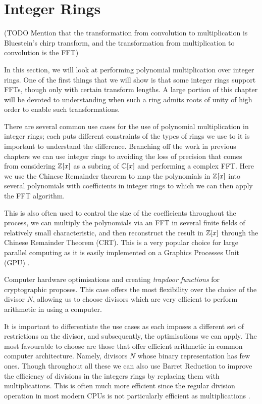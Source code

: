 \chapter{Integer Rings}\label{chp:integer-rings}

(TODO Mention that the transformation from convolution to multiplication is Bluestein's chirp transform, and the transformation from multiplication to convolution is the FFT)

In this section, we will look at performing polynomial multiplication over integer rings. One of the first things that we will show is that some integer rings support FFTs, though only with certain transform lengths. A large portion of this chapter will be devoted to understanding when such a ring admits roots of unity of high order to enable such transformations.

There are several common use cases for the use of polynomial multiplication in integer rings; each puts different constraints of the types of rings we use to it is important to understand the difference. Branching off the work in previous chapters we can use integer rings to avoiding the loss of precision that comes from considering ${\mathbb Z}[x]$ as a subring of ${\mathbb C}[x]$ and performing a complex FFT. Here we use the Chinese Remainder theorem to map the polynomials in ${\mathbb Z}[x]$ into several polynomials with coefficients in integer rings to which we can then apply the FFT algorithm. 

This is also often used to control the size of the coefficients throughout the process, we can multiply the polynomials via an FFT in several finite fields of relatively small characteristic, and then reconstruct the result in ${\mathbb Z}[x]$ through the Chinese Remainder Theorem (CRT). This is a very popular choice for large parallel computing as it is easily implemented on a Graphics Processes Unit (GPU) \cite{gpu-mult} \cite{crt-parallel-mult} \cite{gpu-kepler-architecture}.

Computer hardware optimisations and creating \emph{trapdoor functions} for cryptographic proposes. This case offers the most flexibility over the choice of the divisor $N$, allowing us to choose divisors which are very efficient to perform arithmetic in using a computer.

It is important to differentiate the use cases as each imposes a different set of restrictions on the divisor, and subsequently, the optimisations we can apply. The most favourable to choose are those that offer efficient arithmetic in common computer architecture. Namely, divisors $N$ whose binary representation has few ones. Though throughout all these we can also use Barret Reduction \cite{barret} to improve the efficiency of divisions in the integers rings by replacing them with multiplications. This is often much more efficient since the regular division operation in most modern CPUs is not particularly efficient as multiplications \cite{instruction-times}.

